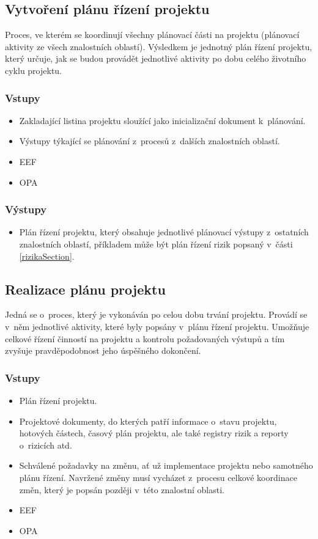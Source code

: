 \subsection*{Vytvoření plánu řízení projektu}

Proces, ve kterém se koordinují všechny plánovací části na projektu (plánovací aktivity ze všech znalostních oblastí). Výsledkem je jednotný plán řízení projektu, který určuje, jak se budou provádět jednotlivé aktivity po dobu celého životního cyklu projektu. 

\subsubsection*{Vstupy}
\begin{itemize}
    \item Zakladající listina projektu sloužící jako inicializační dokument k~plánování.
    \item Výstupy týkající se plánování z~procesů z~dalších znalostních oblastí.
    \item EEF
    \item OPA
\end{itemize}
\subsubsection*{Výstupy}
\begin{itemize}
    \item Plán řízení projektu, který obsahuje jednotlivé plánovací výstupy z~ostatních znalostních oblastí, příkladem může být plán řízení rizik popsaný v~části \ref{rizikaSection}.
\end{itemize}

\subsection*{Realizace plánu projektu}

Jedná se o~proces, který je vykonáván po celou dobu trvání projektu. Provádí se v~něm jednotlivé aktivity, které byly popsány v~plánu řízení projektu. Umožňuje celkové řízení činností na projektu a kontrolu požadovaných výstupů a tím zvyšuje pravděpodobnost jeho úspěšného dokončení.  

\subsubsection*{Vstupy}
\begin{itemize}
    \item Plán řízení projektu.
    \item Projektové dokumenty, do kterých patří informace o~stavu projektu, hotových částech, časový plán projektu, ale také registry rizik a reporty o~rizicích atd.
    \item Schválené požadavky na změnu, ať už implementace projektu nebo samotného plánu řízení. Navržené změny musí vycházet z~procesu celkové koordinace změn, který je popsán později v~této znalostní oblasti.
    \item EEF
    \item OPA
\end{itemize}
